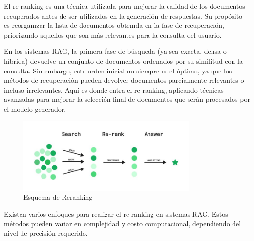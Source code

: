 El re-ranking es una técnica utilizada para mejorar la calidad de los documentos recuperados antes de ser utilizados en la generación de respuestas. 
Su propósito es reorganizar la lista de documentos obtenida en la fase de recuperación, priorizando aquellos que son más relevantes para la consulta del usuario.

En los sistemas RAG, la primera fase de búsqueda (ya sea exacta, densa o híbrida) devuelve un conjunto de documentos ordenados por su similitud con la consulta. 
Sin embargo, este orden inicial no siempre es el óptimo, ya que los métodos de recuperación pueden devolver documentos parcialmente relevantes o incluso irrelevantes. 
Aquí es donde entra el re-ranking, aplicando técnicas avanzadas para mejorar la selección final de documentos que serán procesados por el modelo generador.

\begin{figure}[h]
	\centering
	\includegraphics[width=0.8\textwidth]{figs/rerank.jpg}
	\caption{Esquema de Reranking}
	\label{fig:context-anoni1}
\end{figure}

Existen varios enfoques para realizar el re-ranking en sistemas RAG. Estos métodos pueden variar en complejidad y costo computacional, dependiendo del nivel de precisión requerido.

